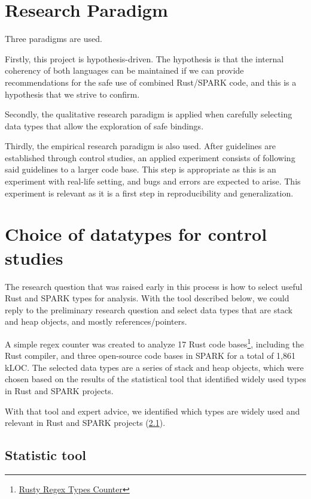 \documentclass[nomenclature, english, bibtex]{kththesis}
\begin{document}
\section{Research Paradigm}
\label{sec:researchParadigm}

Three paradigms are used. 

Firstly, this project is hypothesis-driven. The hypothesis is that the internal coherency of both languages can be maintained if we can provide
recommendations for the safe use of combined Rust/SPARK code, and this is a hypothesis that we strive to confirm.


Secondly, the qualitative research paradigm is applied when carefully selecting data types that allow the exploration of safe bindings.


Thirdly, the empirical research paradigm is also used. After guidelines are established through control studies, an applied experiment consists of following said guidelines to a larger code base. This step is appropriate as this is an experiment with real-life setting, and bugs and errors are expected to arise. This experiment is relevant as it is a first step in reproducibility and generalization.



\section{Choice of datatypes for control studies}
\label{sec:dataCollection}

The research question that was raised early in this process is how to select useful Rust and SPARK types for analysis. 
With the tool described below, we could reply to the preliminary research question and select data types that are stack and heap objects, and mostly references/pointers. 

A simple regex counter was created to analyze 17 Rust code bases\footnote{\href{https://github.com/Dajamante/stat_ada_rust_code}{Rusty Regex Types Counter}}, including the Rust compiler, and three open-source code bases in SPARK for a total of 1,861 k\gls{LOC}. The selected data types are a series of stack and heap objects, which were chosen based on the results of the statistical tool that identified widely used types in Rust and SPARK projects. 

With that tool and expert advice, we identified which types are widely used and relevant in Rust and SPARK projects (\cref{sec:stats}).

\subsection{Statistic tool}
\label{sec:stats}
\end{document}
